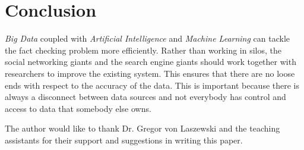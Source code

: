 \documentclass[sigconf]{acmart}
\begin{document}
\section{Conclusion}

{\em Big Data} coupled with {\em Artificial Intelligence} and {\em Machine Learning} can tackle the fact checking problem more efficiently. Rather than working in silos, the social networking giants and the search engine giants should work together with researchers to improve the existing system. This ensures that there are no loose ends with respect to the accuracy of the data. This is important because there is always a disconnect between data sources and not everybody has control and access to data that somebody else owns.
    
\begin{acks}

The author would like to thank Dr. Gregor von Laszewski and the teaching assistants for their support and suggestions in writing this paper.

\end{acks}


 
\end{document}
